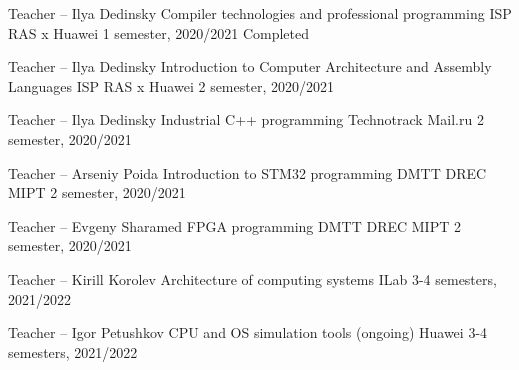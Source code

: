 
\begin{cventries}

  \cventry
    {Teacher -- Ilya Dedinsky} %
    {Compiler technologies and professional programming} %
    {ISP RAS x Huawei} %
    {1 semester, 2020/2021} %
    {Completed} {}

  \cventry
    {Teacher -- Ilya Dedinsky} %
    {Introduction to Computer Architecture and Assembly Languages} %
    {ISP RAS x Huawei} %
    {2 semester, 2020/2021} %
    {} {}

  \cventry
    {Teacher -- Ilya Dedinsky} %
    {Industrial C++ programming} %
    {Technotrack Mail.ru} %
    {2 semester, 2020/2021} %
    {} {}

  \cventry
    {Teacher -- Arseniy Poida} %
    {Introduction to STM32 programming} %
    {DMTT DREC MIPT} %
    {2 semester, 2020/2021} %
    {} {}

  \cventry
    {Teacher -- Evgeny Sharamed} %
    {FPGA programming} %
    {DMTT DREC MIPT} %
    {2 semester, 2020/2021} %
    {} {}

  \cventry
    {Teacher -- Kirill Korolev} %
    {Architecture of computing systems} %
    {ILab} %
    {3-4 semesters, 2021/2022} %
    {} {}

  \cventry
    {Teacher -- Igor Petushkov} %
    {CPU and OS simulation tools (ongoing)} %
    {Huawei} %
    {3-4 semesters, 2021/2022} %
    {} {}

\end{cventries}
